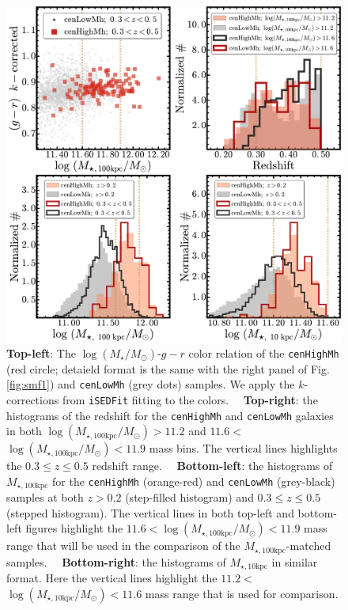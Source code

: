 \documentclass{emulateapj}
\def\rbcg{\texttt{cenHighMh}}
\def\nbcg{\texttt{cenLowMh}}
\def\logms{{$\log (M_{\star}/M_{\odot})$}}
\def\minn{{$M_{\star,10\mathrm{kpc}}$}}
\def\mtot{{$M_{\star,100\mathrm{kpc}}$}}
\def\logminn{{$\log (M_{\star,10\mathrm{kpc}}/M_{\odot})$}}
\def\logmtot{{$\log (M_{\star,100\mathrm{kpc}}/M_{\odot})$}}
\begin{document}
\begin{CJK*}{UTF8}{gbsn}
  \begin{figure}[t!]
      \centering 
      \includegraphics[width=16.5cm]{fig/redbcg_sample_stats}
      \caption{\textbf{Top-left}: The \logms{}-$g-r$ color relation of the \rbcg{} 
          (red circle; detaield format is the same with the right panel of 
          Fig.\ref{fig:smf1}) and \nbcg{} (grey dots) samples.
          We apply the $k$-corrections from \texttt{iSEDFit} fitting to the colors.~~          
          \textbf{Top-right}: the histograms of the redshift for the \rbcg{} and 
          \nbcg{} galaxies in both \logmtot$>11.2$ and $11.6<$\logmtot{}$<11.9$
          mass bins.
          The vertical lines highlights the $0.3\leq z \leq 0.5$ redshift range.~~
          \textbf{Bottom-left}: the histograms of \mtot{} for the \rbcg{} (orange-red) 
          and \nbcg{} (grey-black) samples at both $z>0.2$ (step-filled histogram) and 
          $0.3 \leq z \leq 0.5$ (stepped histogram). 
          The vertical lines in both top-left and bottom-left figures highlight the 
          $11.6<$\logmtot{}$<11.9$ mass range that will be used in the comparison of 
          the \mtot{}-matched samples.~~
          \textbf{Bottom-right}: the histograms of \minn{} in similar format. 
          Here the vertical lines highlight the 
          $11.2<$\logminn{}$<11.6$ mass range that is used for comparison.
      }
      \label{fig:sample_stats}
  \end{figure}
    


\end{CJK*}
\end{document}
